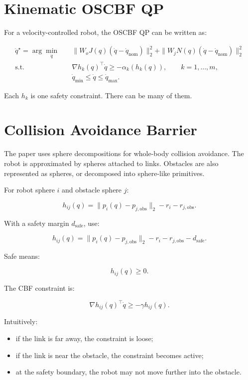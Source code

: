 \documentclass[11pt]{article}
\begin{document}
\section{Kinematic OSCBF QP}

For a velocity-controlled robot, the OSCBF QP can be written as:

\[
\begin{aligned}
\dot{q}^{\star}
= \arg\min_{\dot{q}} \quad
& \|W_o J(q)(\dot{q} - \dot{q}_{\mathrm{nom}})\|_2^2
 + \|W_j N(q)(\dot{q} - \dot{q}_{\mathrm{nom}})\|_2^2 \\
\text{s.t.} \quad
& \nabla h_k(q)^\top \dot{q}
  \ge -\alpha_k(h_k(q)), \qquad k = 1,\dots,m, \\
& \dot{q}_{\min} \le \dot{q} \le \dot{q}_{\max}.
\end{aligned}
\]

Each $h_k$ is one safety constraint. There can be many of them.

\section{Collision Avoidance Barrier}

The paper uses sphere decompositions for whole-body collision avoidance. The
robot is approximated by spheres attached to links. Obstacles are also
represented as spheres, or decomposed into sphere-like primitives.

For robot sphere $i$ and obstacle sphere $j$:

\[
h_{ij}(q)
= \|p_i(q) - p_{j,\mathrm{obs}}\|_2
- r_i
- r_{j,\mathrm{obs}}.
\]

With a safety margin $d_{\mathrm{safe}}$, use:

\[
h_{ij}(q)
= \|p_i(q) - p_{j,\mathrm{obs}}\|_2
- r_i
- r_{j,\mathrm{obs}}
- d_{\mathrm{safe}}.
\]

Safe means:

\[
h_{ij}(q) \ge 0.
\]

The CBF constraint is:

\[
\nabla h_{ij}(q)^\top \dot{q}
\ge
-\gamma h_{ij}(q).
\]

Intuitively:

\begin{itemize}[leftmargin=*]
    \item if the link is far away, the constraint is loose;
    \item if the link is near the obstacle, the constraint becomes active;
    \item at the safety boundary, the robot may not move further into the
    obstacle.
\end{itemize}
\end{document}
